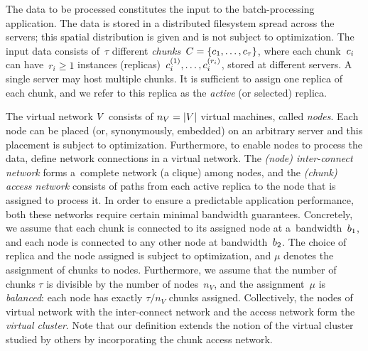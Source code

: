  The data to be processed constitutes the input to the batch-processing application.
The data is stored in a distributed filesystem spread across the servers; this spatial distribution is given and is not subject to optimization.
The input data consists of~$\tau$ different \emph{chunks}~${C = \{ c_1, \ldots, c_{\tau} \}}$,
where each chunk~$c_i$ can have~$r_i\geq 1$ instances (replicas)~$c_{i}^{(1)},\ldots, c_{i}^{(r_i)}$,
 stored at different servers. A single server may host multiple chunks.
It is sufficient to assign one replica of each chunk, and we refer to this
replica as the \emph{active} (or selected) replica.

 The virtual network $V$ consists of $n_V=|V|$ virtual machines, called \emph{nodes}.
Each node can be placed (or, synonymously, embedded) on an arbitrary server and this placement is subject
to optimization.
Furthermore, to enable nodes to process the data, define network connections in a virtual network.
The \emph{(node) inter-connect network} forms a~complete network (a clique) among nodes,
and the \emph{(chunk) access network} consists of paths from each active replica to the node that is assigned to process it.
In order to ensure a predictable application performance, both these networks require certain minimal bandwidth guarantees.
Concretely, we assume that each chunk
is connected to its assigned node at a~bandwidth~$b_1$, and each node is connected to any other node
at  bandwidth~$b_2$.
The choice of replica and the node assigned is subject to optimization, and
$\mu$ denotes the assignment of chunks to nodes.
Furthermore, we assume that the number of chunks $\tau$ is divisible by the number of nodes~$n_V$, and the assignment~$\mu$ is \emph{balanced}:
each node has exactly $\tau / n_V$ chunks assigned.
Collectively, the nodes of virtual network with the inter-connect network and the access network form the \emph{virtual cluster}.
Note that our definition extends the notion of the virtual cluster studied by others \cite{oktopus,talk-about,infocom16,ccr15emb,proteus} by incorporating the chunk access network.


